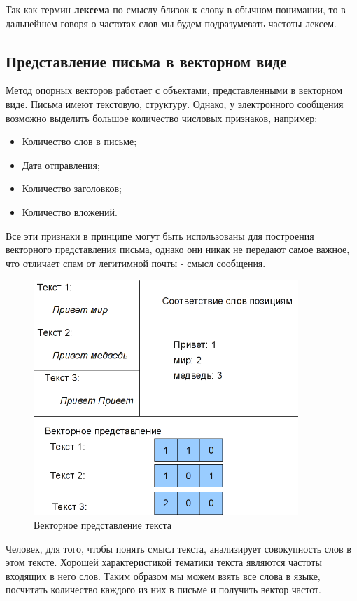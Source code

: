 Так как термин \textbf{лексема} по смыслу близок к слову в обычном понимании, то в дальнейшем говоря о частотах слов мы будем подразумевать частоты лексем.

\subsection{Представление письма в векторном виде}
\label{MESSAGEVECTOR}
Метод опорных векторов работает с объектами, представленными в векторном виде.
Письма имеют текстовую, структуру. Однако, у электронного сообщения возможно выделить большое количество
числовых признаков, например:
\begin{itemize}
    \item Количество слов в письме;
    \item Дата отправления;
    \item Количество заголовков;
    \item Количество вложений.
\end{itemize}
Все эти признаки в принципе могут быть использованы для построения векторного
представления письма, однако они никак не передают самое важное, что отличает
спам от легитимной почты - смысл сообщения.

\begin{figure}[h]
\begin{center}
\includegraphics[width=10cm]{img/vectorize}
\end{center}
\caption{Векторное представление текста}
\label{svm-kernel}
\end{figure}

Человек, для того, чтобы понять смысл текста, анализирует совокупность слов в этом тексте.  Хорошей характеристикой тематики текста являются частоты входящих в него слов.
Таким образом мы можем взять все слова в языке, посчитать количество каждого из них в письме
и получить вектор частот.

